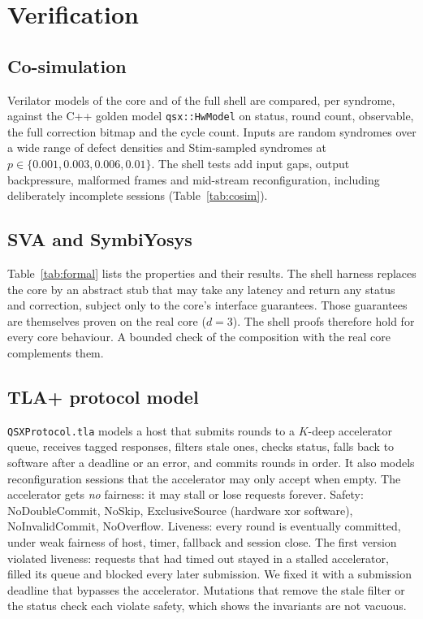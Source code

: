 \documentclass[10pt]{article}
\begin{document}
\section{Verification}\label{sec:verif}
\subsection{Co-simulation}
Verilator models of the core and of the full shell are compared, per syndrome, against the C++ golden
model \texttt{qsx::HwModel} on status, round count, observable, the full correction bitmap and the cycle
count. Inputs are random syndromes over a wide range of defect densities and Stim-sampled syndromes at
$p\in\{0.001,0.003,0.006,0.01\}$. The shell tests add input gaps, output backpressure, malformed frames and
mid-stream reconfiguration, including deliberately incomplete sessions (Table~\ref{tab:cosim}).

\subsection{SVA and SymbiYosys}
Table~\ref{tab:formal} lists the properties and their results. The shell harness replaces the core by an
abstract stub that may take any latency and return any status and correction, subject only to the core's
interface guarantees. Those guarantees are themselves proven on the real core ($d=3$). The shell proofs
therefore hold for every core behaviour. A bounded check of the composition with the real core
complements them.

\subsection{TLA+ protocol model}
\texttt{QSXProtocol.tla} models a host that submits rounds to a $K$-deep accelerator queue, receives
tagged responses, filters stale ones, checks status, falls back to software after a deadline or an error,
and commits rounds in order. It also models reconfiguration sessions that the accelerator may only accept when
empty. The accelerator gets \emph{no} fairness: it may stall or lose requests forever. Safety:
\textsf{NoDoubleCommit}, \textsf{NoSkip}, \textsf{ExclusiveSource} (hardware xor software),
\textsf{NoInvalidCommit}, \textsf{NoOverflow}. Liveness: every round is eventually committed, under weak
fairness of host, timer, fallback and session close. The first version violated liveness: requests that had
timed out stayed in a stalled accelerator, filled its queue and blocked every later submission. We fixed it
with a submission deadline that bypasses the accelerator. Mutations that remove the stale filter or the
status check each violate safety, which shows the invariants are not vacuous.
\end{document}
